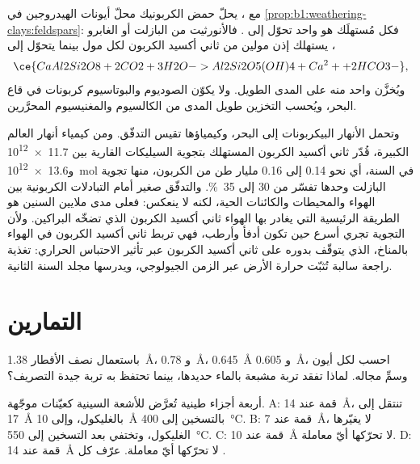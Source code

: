 مع ، يحلّ حمض الكربونيك محلّ أيونات الهيدروجين في \cref{prop:b1:weathering-clays:feldspars}: فكل  مُستهلَك هو  واحد تحوّل إلى . فالأنورثيت من البازلت أو الغابرو يستهلك إذن مولين من ثاني أكسيد الكربون لكل مول بينما يتحوّل إلى ،
\[
  \ce{CaAl2Si2O8 + 2 CO2 + 3 H2O -> Al2Si2O5(OH)4 + Ca^2+ + 2 HCO3-},
\]
ويُخزَّن واحد منه على المدى الطويل. ولا يكوّن الصوديوم والبوتاسيوم كربونات في قاع البحر، ويُحسب التخزين طويل المدى من الكالسيوم والمغنيسيوم المحرَّرين.

وتحمل الأنهار البيكربونات إلى البحر، وكيمياؤها تقيس التدفّق. ومن كيمياء أنهار العالم الكبيرة، قُدّر ثاني أكسيد الكربون المستهلك بتجوية السيليكات القارية بين \num{11.7e12} و\qty{13.6e12}{mol} في السنة، أي نحو 0.14 إلى 0.16 مليار طن من الكربون، منها تجوية البازلت وحدها تفسّر من 30 إلى \qty{35}{\percent}. والتدفّق صغير أمام التبادلات الكربونية بين الهواء والمحيطات والكائنات الحية، لكنه لا ينعكس: فعلى مدى ملايين السنين هو الطريقة الرئيسية التي يغادر بها الهواء ثاني أكسيد الكربون الذي تضخّه البراكين. ولأن التجوية تجري أسرع حين تكون أدفأ وأرطب، فهي تربط ثاني أكسيد الكربون في الهواء بالمناخ، الذي يتوقّف بدوره على ثاني أكسيد الكربون عبر تأثير الاحتباس الحراري: تغذية راجعة سالبة تُثبّت حرارة الأرض عبر الزمن الجيولوجي، ويدرسها مجلد السنة الثانية.

\section{التمارين}

\begin{exercise}[$\star$]\label{exo:b1:weathering-clays:1}
باستعمال نصف الأقطار  \qty{1.38}{\angstrom}، و \qty{0.78}{\angstrom}،
 \qty{0.645}{\angstrom} و \qty{0.605}{\angstrom}، احسب  لكل أيون وسمِّ مجاله. لماذا تفقد تربة مشبعة بالماء حديدها، بينما تحتفظ به تربة جيدة التصريف؟
\end{exercise}

\begin{exercise}[$\star$]\label{exo:b1:weathering-clays:2}
أربعة أجزاء طينية تُعرَّض للأشعة السينية كعيّنات موجّهة. A: قمة عند
\SI{14}{\angstrom}، تنتقل إلى \SI{17}{\angstrom} بالغليكول، وإلى
\SI{10}{\angstrom} بالتسخين إلى \SI{400}{\celsius}. B: قمة عند
\SI{7}{\angstrom}، لا يغيّرها الغليكول، وتختفي بعد التسخين إلى
\SI{550}{\celsius}. C: قمة عند \SI{10}{\angstrom} لا تحرّكها أيّ معاملة. D:
قمة عند \SI{14}{\angstrom} لا تحرّكها أيّ معاملة. عرّف كل .
\end{exercise}

